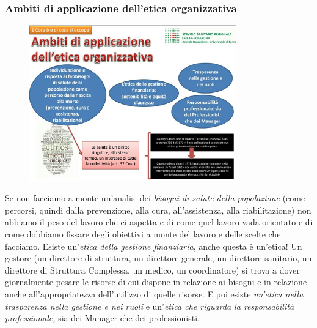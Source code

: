 \subsubsection{Ambiti di applicazione dell'etica organizzativa}

 \begin{figure}[!ht]
\centering
	\includegraphics[width=0.8\textwidth]{32/image4.jpeg}
	\end{figure}

Se non facciamo a monte un'analisi dei \emph{bisogni di salute della
popolazione} (come percorsi, quindi dalla prevenzione, alla cura,
all'assistenza, alla riabilitazione) non abbiamo il peso del lavoro che
ci aspetta e di come quel lavoro vada orientato e di come dobbiamo
fissare degli obiettivi a monte del lavoro e delle scelte che facciamo.
Esiste un'\emph{etica della gestione finanziaria}, anche questa è
un'etica! Un gestore (un direttore di struttura, un direttore generale,
un direttore sanitario, un direttore di Struttura Complessa, un medico,
un coordinatore) si trova a dover giornalmente pesare le risorse di cui
dispone in relazione ai bisogni e in relazione anche all'appropriatezza
dell'utilizzo di quelle risorse. E poi esiste \emph{un'etica nella
trasparenza nella gestione e nei ruoli} e un'\emph{etica che riguarda la
responsabilità professionale,} sia dei Manager che dei professionisti.

